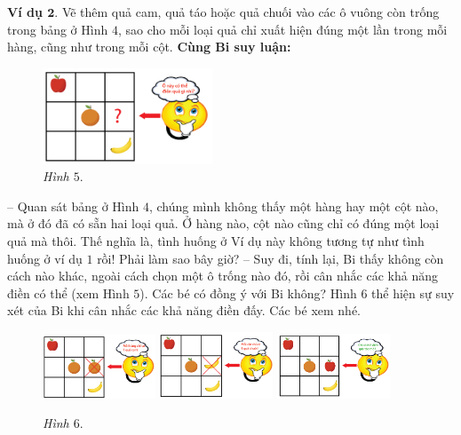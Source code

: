 	\textbf{\color{toancuabi}Ví dụ $\pmb2.$} Vẽ thêm quả cam, quả táo hoặc quả chuối vào các ô vuông còn trống trong bảng ở Hình $4$, sao cho mỗi loại quả chỉ xuất hiện đúng một lần trong mỗi hàng, cũng như trong mỗi cột.
	\vskip 0.1cm
	\textbf{\color{toancuabi}Cùng Bi suy luận:}
	\vskip 0.15cm
	\begin{figure}
		\centering
		\vspace*{-5pt}
		\captionsetup{labelformat= empty, justification=centering}
		\includegraphics[width=0.45\textwidth]{hinh5}
		\caption{\small\textit{Hình $5.$}}
		\vspace*{-5pt}
	\end{figure}
	-- Quan sát bảng ở Hình $4$, chúng mình không thấy một hàng hay một cột nào, mà ở đó đã có sẵn hai loại quả. Ở hàng nào, cột nào cũng chỉ có đúng một loại quả mà thôi. Thế nghĩa là,  tình huống ở Ví dụ này không tương tự như tình huống ở ví dụ $1$ rồi! Phải làm sao bây giờ?
	\vskip 0.1cm	
	-- Suy đi, tính lại, Bi thấy không còn cách nào khác, ngoài cách chọn một ô trống nào đó, rồi cân nhắc các khả năng điền có thể (xem Hình $5$). Các bé có đồng ý với Bi không?
	\vskip 0.1cm
	Hình $6$ thể hiện sự suy xét của Bi khi cân nhắc các khả năng điền đấy. Các bé xem nhé.
	\begin{figure}[H]
		\centering
		\vspace*{-5pt}
		\captionsetup{labelformat= empty, justification=centering}
		\includegraphics[width=0.3\textwidth]{hinh6a}\hfill
		\includegraphics[width=0.3\textwidth]{hinh6b}\hfill
		\includegraphics[width=0.3\textwidth]{hinh6c}
		\caption{\small\textit{Hình $6.$}}
		\vspace*{-10pt}
	\end{figure}

